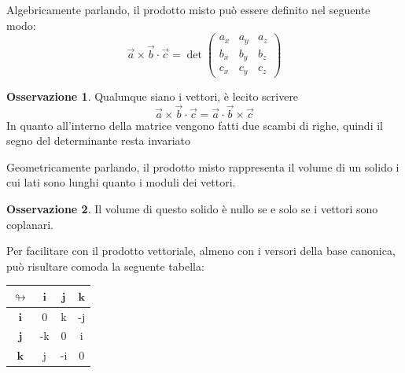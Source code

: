 \documentclass[11pt,a4paper,twoside]{article}
\theoremstyle{definition}
\newtheorem*{oss}{Osservazione}
\begin{document}
Algebricamente parlando, il prodotto misto può essere definito nel seguente modo:
\[
	\vec a \times \vec b \cdot \vec c = \det \begin{pmatrix}a_x & a_y & a_z\\ b_x & b_y & b_z\\ c_x & c_y & c_z\end{pmatrix}
\]

\begin{oss}
	Qualunque siano i vettori, è lecito scrivere
	\[ \vec a \times \vec b \cdot \vec c = \vec a \cdot \vec b \times \vec c\]
	In quanto all'interno della matrice vengono fatti due scambi di righe, quindi il segno del determinante resta invariato
\end{oss}

Geometricamente parlando, il prodotto misto rappresenta il volume di un solido i cui lati sono lunghi quanto i moduli dei vettori.

\begin{center}
\end{center}

\begin{oss}
	Il volume di questo solido è nullo se e solo se i vettori sono coplanari.
\end{oss}

Per facilitare con il prodotto vettoriale, almeno con i versori della base canonica, può risultare comoda la seguente tabella:

\begin{center}
	\begin{tabular}{| c | c | c | c |}
		\hline
		$\mathbf \looparrowright$ & $\mathbf i$ & $\mathbf j$ & $\mathbf k$\\
		\hline
		$\mathbf i$ & 0 & k & -j\\
		\hline
		$\mathbf j$ & -k & 0 & i\\
		\hline
		$\mathbf k$ & j & -i & 0\\
		\hline
	\end{tabular}
\end{center}
\end{document}
